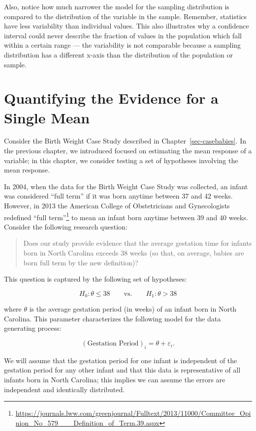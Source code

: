 \documentclass[
  letterpaper,
  DIV=11,
  numbers=noendperiod]{scrreprt}
\theoremstyle{definition}
\theoremstyle{definition}
\theoremstyle{plain}
\theoremstyle{remark}
\begin{document}
Also, notice how much narrower the model for the sampling distribution
is compared to the distribution of the variable in the sample. Remember,
statistics have less variability than individual values. This also
illustrates why a confidence interval could never describe the fraction
of values in the population which fall within a certain range --- the
variability is not comparable because a sampling distribution has a
different x-axis than the distribution of the population or sample.

\chapter{Quantifying the Evidence for a Single Mean}\label{sec-teststat}

Consider the Birth Weight Case Study described in
Chapter~\ref{sec-casebabies}. In the previous chapter, we introduced
focused on estimating the mean response of a variable; in this chapter,
we consider testing a set of hypotheses involving the mean response.

In 2004, when the data for the Birth Weight Case Study was collected, an
infant was considered ``full term'' if it was born anytime between 37
and 42 weeks. However, in 2013 the American College of Obstetricians and
Gynecologists redefined ``full term''\footnote{\url{https://journals.lww.com/greenjournal/Fulltext/2013/11000/Committee_Opinion_No_579___Definition_of_Term.39.aspx}}
to mean an infant born anytime between 39 and 40 weeks. Consider the
following research question:

\begin{quote}
Does our study provide evidence that the average gestation time for
infants born in North Carolina exceeds 38 weeks (so that, on average,
babies are born full term by the new definition)?
\end{quote}

This question is captured by the following set of hypotheses:

\[H_0: \theta \leq 38 \qquad \text{vs.} \qquad H_1: \theta > 38\]

where \(\theta\) is the average gestation period (in weeks) of an infant
born in North Carolina. This parameter characterizes the following model
for the data generating process:

\[(\text{Gestation Period})_i = \theta + \varepsilon_i.\]

We will assume that the gestation period for one infant is independent
of the gestation period for any other infant and that this data is
representative of all infants born in North Carolina; this implies we
can assume the errors are independent and identically distributed.
\end{document}
